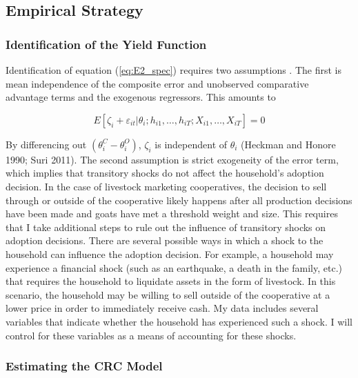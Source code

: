 \documentclass[11pt]{article}
\begin{document}
\subsection{Empirical Strategy} \label{sec:E2_emp}

\subsubsection{Identification of the Yield Function}

Identification of equation (\ref{eq:E2_spec}) requires two assumptions \citep{michler-et.al.18,suri11}. The first is mean independence of the composite error and unobserved comparative advantage terms and the exogenous regressors. This amounts to

\begin{equation} \label{eq:E2_assumption1}
    E[\zeta_i + \varepsilon_{it} | \theta_{i}; h_{i1}, \dots, h_{iT}; X_{i1}, \dots, X_{iT}] = 0
\end{equation}

By differencing out $(\theta^{C}_{i} - \theta^{O}_{i})$, $\zeta_i$ is independent of $\theta_i$ (Heckman and Honore 1990; Suri 2011). The second assumption is strict exogeneity of the error term, which implies that transitory shocks do not affect the household’s adoption decision. In the case of livestock marketing cooperatives, the decision to sell through or outside of the cooperative likely happens after all production decisions have been made and goats have met a threshold weight and size. This requires that I take additional steps to rule out the influence of transitory shocks on adoption decisions. There are several possible ways in which a shock to the household can influence the adoption decision. For example, a household may experience a financial shock (such as an earthquake, a death in the family, etc.) that requires the household to liquidate assets in the form of livestock. In this scenario, the household may be willing to sell outside of the cooperative at a lower price in order to immediately receive cash. My data includes several variables that indicate whether the household has experienced such a shock. I will control for these variables as a means of accounting for these shocks.


\subsubsection{Estimating the CRC Model} \label{sec:E2_est}
\end{document}

